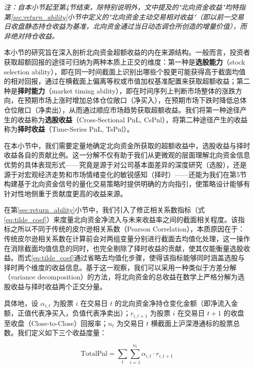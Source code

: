 \documentclass{article}
\begin{document}
\textit{注：自本小节起至第4节结束，除特别说明外，文中提及的"北向资金收益"均特指第\ref{sec:return_ability}小节中定义的"北向资金主动交易相对收益"（即以前一交易日收盘静态持仓收益为基准，北向资金通过当日动态调仓所创造的增量价值），而非绝对持仓收益。}

\vspace{0.5em}

本小节的研究旨在深入剖析北向资金超额收益的内在来源结构。一般而言，投资者获取超额回报的途径可归纳为两种本质上正交的维度：第一种是\textbf{选股能力}（stock selection ability），即在同一时间截面上识别出哪些个股更可能获得高于截面均值的相对回报，通过在横截面上偏离等权或市值加权基准配置来获取超额收益；第二种是\textbf{择时能力}（market timing ability），即在时间序列上判断市场整体的涨跌方向，在预期市场上涨时增加总体仓位敞口（净买入），在预期市场下跌时降低总体仓位敞口（净卖出），从而通过顺应市场趋势获取超额收益。我们将第一种途径产生的收益称为\textbf{选股收益}（Cross-Sectional PnL, CsPnl），将第二种途径产生的收益称为\textbf{择时收益}（Time-Series PnL, TsPnl）。

在本小节中，我们需要定量地确定北向资金所获取的超额收益中，选股收益与择时收益各自的贡献比例。这一分解不仅有助于我们从更微观的层面理解北向资金信息优势的具体表现形式——究竟是源于对公司基本面差异的深度研究（选股），还是源于对宏观经济走势和市场情绪变化的敏锐感知（择时）——还能为我们在第5节构建基于北向资金信号的量化交易策略时提供明确的方向指引，使策略设计能够有针对性地侧重于贡献度更高的收益来源。

在第\ref{sec:return_ability}小节中，我们引入了修正相关系数指标（式\ref{eq:tilde_coef}）来度量北向资金净流入与未来收益率之间的截面相关程度。该指标之所以不同于传统的皮尔逊相关系数（Pearson Correlation），本质原因在于：传统皮尔逊相关系数在计算前会对两组变量分别进行截面去均值化处理，这一操作在消除截面均值信息的同时，也完全剔除了择时收益的贡献，使其仅能衡量选股收益。而式\ref{eq:tilde_coef}通过省略去均值化步骤，使得该指标能够同时涵盖选股与择时两个维度的收益信息。基于这一观察，我们可以采用一种类似于方差分解（variance decomposition）的方法，将北向资金的总收益在数学上严格分解为选股收益与择时收益两个正交分量。

具体地，设 $\alpha_{i,t}$ 为股票 $i$ 在交易日 $t$ 的北向资金净持仓变化金额（即净流入金额，正值代表净买入，负值代表净卖出）；$r_{i,t+1}$ 为股票 $i$ 在交易日 $t+1$ 的收盘至收盘（Close-to-Close）回报率；$n_t$ 为交易日 $t$ 横截面上沪深港通标的股票总数。我们定义如下三个收益度量：

\begin{equation}
    \text{TotalPnl} = \sum_{t} \sum_{i=1}^{n_t} \alpha_{i,t} \cdot r_{i,t+1}
    \label{eq:total_pnl}
\end{equation}
\end{document}
